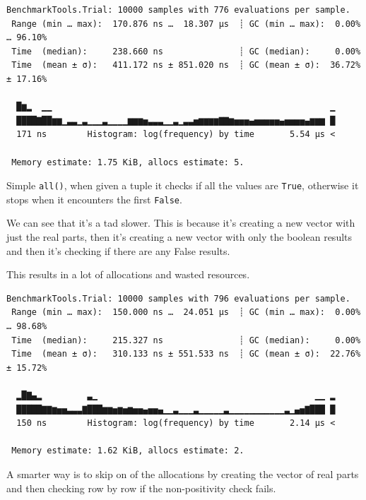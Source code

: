 \documentclass[
  8pt,
  a4paper,
]{book}
\newenvironment{Shaded}{\begin{snugshade}}{\end{snugshade}}
\newcommand{\FloatTok}[1]{\textcolor[rgb]{0.68,0.00,0.00}{#1}}
\newcommand{\FunctionTok}[1]{\textcolor[rgb]{0.28,0.35,0.67}{#1}}
\newcommand{\NormalTok}[1]{\textcolor[rgb]{0.00,0.23,0.31}{#1}}
\newcommand{\OperatorTok}[1]{\textcolor[rgb]{0.37,0.37,0.37}{#1}}
\newcommand{\PreprocessorTok}[1]{\textcolor[rgb]{0.68,0.00,0.00}{#1}}
\begin{document}
\begin{verbatim}
BenchmarkTools.Trial: 10000 samples with 776 evaluations per sample.
 Range (min … max):  170.876 ns …  18.307 μs  ┊ GC (min … max):  0.00% … 96.10%
 Time  (median):     238.660 ns               ┊ GC (median):     0.00%
 Time  (mean ± σ):   411.172 ns ± 851.020 ns  ┊ GC (mean ± σ):  36.72% ± 17.16%

  █▆▂  ▁▁                                                       ▁
  ████▇██▆▆▁▃▃▁▃▁▁▁▃▁▁▁▁▆▆▆▅▃▃▃▁▁▃▁▃▃▅▆▆▆▆▇▇▆▅▅▅▄▅▅▅▅▅▄▅▅▅▅▄▆▆▆ █
  171 ns        Histogram: log(frequency) by time       5.54 μs <

 Memory estimate: 1.75 KiB, allocs estimate: 5.
\end{verbatim}

Simple \texttt{all()}, when given a tuple it checks if all the values
are \texttt{True}, otherwise it stops when it encounters the first
\texttt{False}.

We can see that it's a tad slower. This is because it's creating a new
vector with just the real parts, then it's creating a new vector with
only the boolean results and then it's checking if there are any False
results.

This results in a lot of allocations and wasted resources.

\begin{Shaded}
\end{Shaded}

\begin{verbatim}
BenchmarkTools.Trial: 10000 samples with 796 evaluations per sample.
 Range (min … max):  150.000 ns …  24.051 μs  ┊ GC (min … max):  0.00% … 98.68%
 Time  (median):     215.327 ns               ┊ GC (median):     0.00%
 Time  (mean ± σ):   310.133 ns ± 551.533 ns  ┊ GC (mean ± σ):  22.76% ± 15.72%

  ▂█▇▄▂         ▃▁                                           ▁▁ ▂
  █████▇▇▆▅▅▃▃▃▇███▆▆▅▆▅▆▅▅▄▅▅▄▁▁▃▁▁▁▃▁▁▁▁▁▃▁▁▁▁▁▁▁▁▁▁▁▃▁▄▅▇███ █
  150 ns        Histogram: log(frequency) by time       2.14 μs <

 Memory estimate: 1.62 KiB, allocs estimate: 2.
\end{verbatim}

A smarter way is to skip on of the allocations by creating the vector of
real parts and then checking row by row if the non-positivity check
fails.
\end{document}
